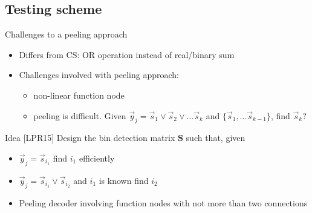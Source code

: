 \subsection{Testing scheme}
\begin{frame}{Challenges to a peeling approach}
\begin{itemize}
\item Differs from CS: OR operation instead of real/binary sum
\item Challenges involved with peeling approach:
\begin{itemize}
\item non-linear function node
\item peeling is difficult. Given $\vec{y}_j=\vec{s}_{1}\vee \vec{s}_{2}\vee \ldots \vec{s}_{k}$ and $\{\vec{s}_1,\ldots \vec{s}_{k-1}\}$, find $\vec{s}_k$? 
\end{itemize}
\end{itemize}
\vspace{3ex}
\pause

\begin{block}{Idea [LPR15]}
Design the bin detection matrix $\mathbf{S}$ such that, given
\begin{itemize}
\item  $\vec{y}_j=\vec{s}_{i_1}$ find $i_1$ efficiently
\item $\vec{y}_j=\vec{s}_{i_1}\vee \vec{s}_{i_2}$ and $i_1$ is known find $i_2$
\item<3-> Peeling decoder involving function nodes with not more than two connections
\end{itemize}

\end{block}
\end{frame}

